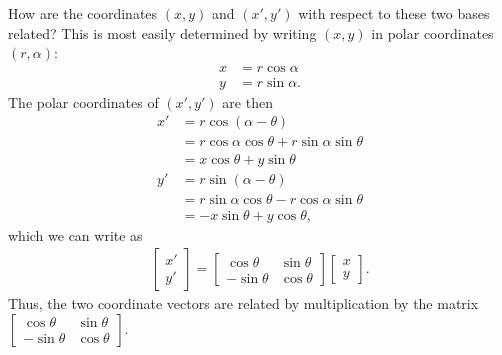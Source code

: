 \documentclass[12pt,letterpaper,reqno]{article}
\numberwithin{equation}{section}
\begin{document}
How are the coordinates $(x,y)$ and $(x',y')$ with respect to these two bases related? This is most easily determined by writing $(x,y)$ in polar coordinates $(r,\alpha)$:
\begin{align}
x&=r\cos\alpha \\
y&=r\sin\alpha. 	
\end{align}
The polar coordinates of $(x',y')$ are then
\begin{align*}
x'&=r\cos(\alpha-\theta) \\
&=r\cos\alpha\cos\theta+r\sin\alpha\sin\theta \\
&=x\cos\theta+y\sin\theta \\
y'&=r\sin(\alpha-\theta) \\	
&=r\sin\alpha\cos\theta-r\cos\alpha\sin\theta \\
&=-x\sin\theta+y\cos\theta,
\end{align*}
which we can write as 
\begin{align*}
	\begin{bmatrix}
		x'\\y'
	\end{bmatrix}=\begin{bmatrix}
		\cos\theta & \sin\theta \\
		-\sin\theta & \cos\theta
	\end{bmatrix}\begin{bmatrix}
		x \\ y
	\end{bmatrix}.
\end{align*}
Thus, the two coordinate vectors are related by multiplication by the matrix $\begin{bmatrix}
		\cos\theta & \sin\theta \\
		-\sin\theta & \cos\theta
	\end{bmatrix}$.
	
\end{document}
